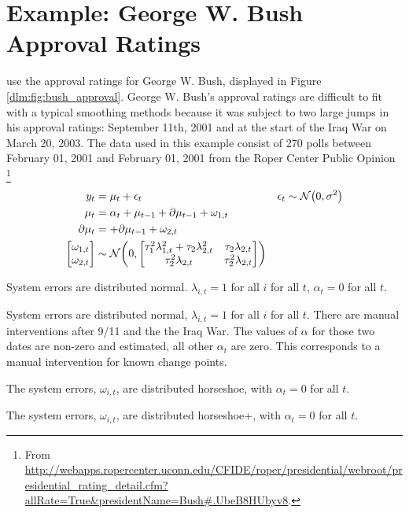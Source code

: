\section{Example: George W. Bush Approval Ratings}
\label{dlm:sec:george-w.-bush}

\textcite{RatkovicEng2010} use the approval ratings for George W. Bush, displayed in Figure \ref{dlm:fig:bush_approval}.
George W. Bush's approval ratings are difficult to fit with a typical smoothing methods because it was subject to two large jumps in his approval ratings: September 11th, 2001 and at the start of the Iraq War on March 20, 2003.
The data used in this example consist of 270 polls between February 01, 2001 and February 01, 2001 from the Roper Center Public Opinion \footnote{From \url{http://webapps.ropercenter.uconn.edu/CFIDE/roper/presidential/webroot/presidential_rating_detail.cfm?allRate=True\&presidentName=Bush\#.UbeB8HUbyv8}.}

\begin{equation}
  \label{dlm:eq:30}
  \begin{aligned}[t]
    y_{t} &= \mu_{t} + \epsilon_{t} & \epsilon_{t} & \sim \mathcal{N}\mathopen{}\left(0, \sigma^{2}\right)\mathclose{} \\
    \mu_{t} &= \alpha_{t} +  \mu_{t - 1} + \partial \mu_{t - 1} + \omega_{1, t} \\
    \partial \mu_{t} &= + \partial \mu_{t - 1} + \omega_{2, t} \\
    \begin{bmatrix}
      \omega_{1, t} \\
      \omega_{2, t}
    \end{bmatrix} &
                    \sim \mathcal{N}\mathopen{}\left(0,
                    \begin{bmatrix}
                      \tau_{1}^{2} \lambda_{1, t}^{2} + \tau_{2} \lambda_{2, t}^{2} & \tau_{2} \lambda_{2, t} \\
                      \tau_{2}^{2} \lambda_{2, t} & \tau_{2}^{2} \lambda_{2, t}
                    \end{bmatrix}
                    \right)\mathclose{}
  \end{aligned}
\end{equation}


\begin{description}[font = \normalfont\ModelII]
\item[Normal]
  System errors are distributed normal.
  $\lambda_{i, t} = 1$  for all $i$ for all $t$, $\alpha_{t} = 0$ for all $t$.
\item[Intervention]
  System errors are distributed normal, $\lambda_{i, t} = 1$  for all $i$ for all $t$.
  There are manual interventions after 9/11 and the the Iraq War. 
  The values of $\alpha$ for those two dates are non-zero and estimated, all other $\alpha_{t}$ are zero.
  This corresponds to a manual intervention for known change points.
\item[Horseshoe] The system errors, $\omega_{i,t}$, are distributed horseshoe, with $\alpha_{t} = 0$ for all $t$.
\item[Horseshoe+] The system errors, $\omega_{i,t}$, are distributed horseshoe+, with  $\alpha_{t}= 0$ for all $t$.
\end{description}



